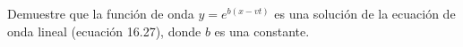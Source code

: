 \item Demuestre que la función de onda $y = e^{b(x - vt)}$ es una solución de la ecuación de onda lineal (ecuación 16.27), donde $b$ es una constante.